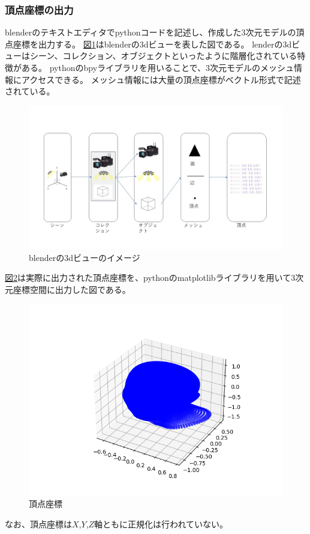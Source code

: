 \documentclass[]{jarticle}          %
\begin{document}
\subsubsection{頂点座標の出力}
blenderのテキストエディタでpythonコードを記述し、作成した3次元モデルの頂点座標を出力する。
\hyperref[three]{図\ref{three}}はblenderの3dビューを表した図である。
lenderの3dビューはシーン、コレクション、オブジェクトといったように階層化されている特徴がある。
pythonのbpyライブラリを用いることで、3次元モデルのメッシュ情報にアクセスできる。
メッシュ情報には大量の頂点座標がベクトル形式で記述されている。
\begin{figure}[!ht]
  \begin{center}
    \includegraphics[scale=0.5]{figures/blender.jpg}
    \caption{blenderの3dビューのイメージ}
    \label{three}
  \end{center}
\end{figure}

\hyperref[four]{図\ref{four}}は実際に出力された頂点座標を、pythonのmatplotlibライブラリを用いて3次元座標空間に出力した図である。
\begin{figure}[!ht]
  \begin{center}
    \includegraphics[scale=0.7]{figures/coord530.png}
    \caption{頂点座標}
    \label{four}
  \end{center}
\end{figure}
なお、頂点座標は$X$,$Y$,$Z$軸ともに正規化は行われていない。
\end{document}
